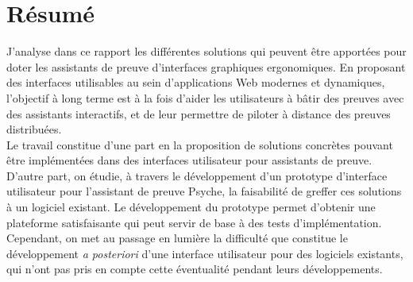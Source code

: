 \section*{Résumé} %

J'analyse dans ce rapport les différentes solutions qui peuvent être apportées pour doter les assistants de preuve d'interfaces graphiques ergonomiques. En proposant des interfaces utilisables au sein d'applications Web modernes et dynamiques, l'objectif à long terme est à la fois d'aider les utilisateurs à bâtir des preuves avec des assistants interactifs, et de leur permettre de piloter à distance des preuves distribuées.\\

Le travail constitue d'une part en la proposition de solutions concrètes pouvant être implémentées dans des interfaces utilisateur pour assistants de preuve. D'autre part, on étudie, à travers le développement d'un prototype d'interface utilisateur pour l'assistant de preuve Psyche, la faisabilité de greffer ces solutions à un logiciel existant. Le développement du prototype permet d'obtenir une plateforme satisfaisante qui peut servir de base à des tests d'implémentation. Cependant, on met au passage en lumière la difficulté que constitue le développement \textit{a posteriori} d'une interface utilisateur pour des logiciels existants, qui n'ont pas pris en compte cette éventualité pendant leurs développements.
